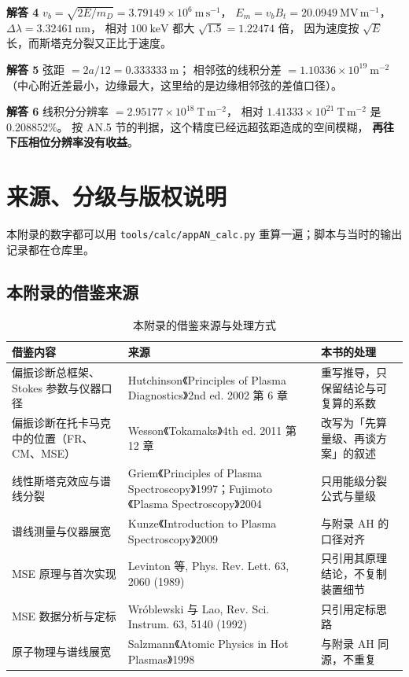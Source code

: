 \textbf{解答 4}
$v_b=\sqrt{2E/m_D}=3.79149\times10^{6}\ \mathrm{m\,s^{-1}}$，
$E_m=v_bB_t=20.0949\ \mathrm{MV\,m^{-1}}$，
$\Delta\lambda=3.32461\ \mathrm{nm}$，
相对 $100\ \mathrm{keV}$ 都大 $\sqrt{1.5}=1.22474$ 倍，
因为速度按 $\sqrt{E}$ 长，而斯塔克分裂又正比于速度。

\textbf{解答 5}
弦距 $=2a/12=0.333333\ \mathrm{m}$；
相邻弦的线积分差 $=1.10336\times10^{19}\ \mathrm{m^{-2}}$
（中心附近差最小，边缘最大，这里给的是边缘相邻弦的差值口径）。

\textbf{解答 6}
线积分分辨率 $=2.95177\times10^{18}\ \mathrm{T\,m^{-2}}$，
相对 $1.41333\times10^{21}\ \mathrm{T\,m^{-2}}$ 是 $0.208852\%$。
按 AN.5 节的判据，这个精度已经远超弦距造成的空间模糊，
\textbf{再往下压相位分辨率没有收益}。

\section{来源、分级与版权说明}

\begingroup\small
本附录的数字都可以用 \texttt{tools/\allowbreak{}calc/\allowbreak{}appAN\_calc.py} 重算一遍；脚本与当时的输出记录都在仓库里。
\label{sec:app-an-source}

\subsection*{本附录的借鉴来源}

\begin{table}[htbp]
\centering
\caption{本附录的借鉴来源与处理方式}
\label{tab:app-an-source}
\small
\begin{tabular}{p{3.6cm} p{4.6cm} p{5.4cm}}
\toprule
借鉴内容 & 来源 & 本书的处理 \\
\midrule
偏振诊断总框架、Stokes 参数与仪器口径 & Hutchinson《Principles of Plasma Diagnostics》2nd ed. 2002 第 6 章 & 重写推导，只保留结论与可复算的系数 \\
偏振诊断在托卡马克中的位置（FR、CM、MSE） & Wesson《Tokamaks》4th ed. 2011 第 12 章 & 改写为「先算量级、再谈方案」的叙述 \\
线性斯塔克效应与谱线分裂 & Griem《Principles of Plasma Spectroscopy》1997；Fujimoto《Plasma Spectroscopy》2004 & 只用能级分裂公式与量级 \\
谱线测量与仪器展宽 & Kunze《Introduction to Plasma Spectroscopy》2009 & 与附录 AH 的口径对齐 \\
MSE 原理与首次实现 & Levinton 等, Phys. Rev. Lett. 63, 2060 (1989) & 只引用其原理结论，不复制装置细节 \\
MSE 数据分析与定标 & Wróblewski 与 Lao, Rev. Sci. Instrum. 63, 5140 (1992) & 只引用定标思路 \\
原子物理与谱线展宽 & Salzmann《Atomic Physics in Hot Plasmas》1998 & 与附录 AH 同源，不重复 \\
\bottomrule
\end{tabular}
\end{table}

